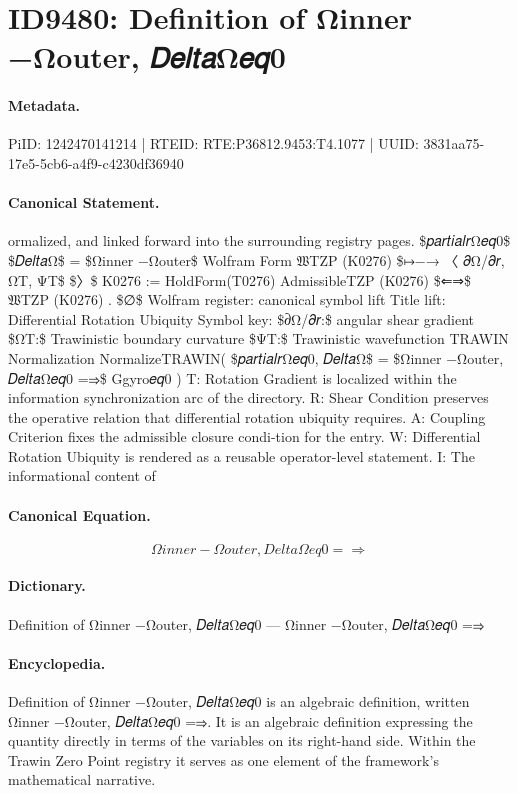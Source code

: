 \section*{ID9480: Definition of Ωinner −Ωouter, 𝐷𝑒𝑙𝑡𝑎Ω𝑒𝑞0}
\paragraph{Metadata.}
PiID: 1242470141214 | RTEID: RTE:P36812.9453:T4.1077 | UUID: 3831aa75-17e5-5cb6-a4f9-c4230df36940

\paragraph{Canonical Statement.}
ormalized, and linked forward into the surrounding registry pages. \$𝑝𝑎𝑟𝑡𝑖𝑎𝑙𝑟Ω𝑒𝑞0\$ \$𝐷𝑒𝑙𝑡𝑎Ω\$ = \$Ωinner −Ωouter\$ Wolfram Form 𝔚TZP (K0276) \$↦−→ 〈 𝜕Ω/𝜕𝑟, ΩT, ΨT\$ \$〉\$ K0276 := HoldForm(T0276) AdmissibleTZP (K0276) \$⇐⇒\$ 𝔚TZP (K0276) . \$∅\$ Wolfram register: canonical symbol lift Title lift: Differential Rotation Ubiquity Symbol key: \$𝜕Ω/𝜕𝑟:\$ angular shear gradient \$ΩT:\$ Trawinistic boundary curvature \$ΨT:\$ Trawinistic wavefunction TRAWIN Normalization NormalizeTRAWIN( \$𝑝𝑎𝑟𝑡𝑖𝑎𝑙𝑟Ω𝑒𝑞0, 𝐷𝑒𝑙𝑡𝑎Ω\$ = \$Ωinner −Ωouter, 𝐷𝑒𝑙𝑡𝑎Ω𝑒𝑞0 =⇒\$ Ggyro𝑒𝑞0 ) T: Rotation Gradient is localized within the information synchronization arc of the directory. R: Shear Condition preserves the operative relation that differential rotation ubiquity requires. A: Coupling Criterion fixes the admissible closure condi-tion for the entry. W: Differential Rotation Ubiquity is rendered as a reusable operator-level statement. I: The informational content of

\paragraph{Canonical Equation.}
\[
Ωinner −Ωouter, 𝐷𝑒𝑙𝑡𝑎Ω𝑒𝑞0 =⇒
\]

\paragraph{Dictionary.}
Definition of Ωinner −Ωouter, 𝐷𝑒𝑙𝑡𝑎Ω𝑒𝑞0 — Ωinner −Ωouter, 𝐷𝑒𝑙𝑡𝑎Ω𝑒𝑞0 =⇒

\paragraph{Encyclopedia.}
Definition of Ωinner −Ωouter, 𝐷𝑒𝑙𝑡𝑎Ω𝑒𝑞0 is an algebraic definition, written Ωinner −Ωouter, 𝐷𝑒𝑙𝑡𝑎Ω𝑒𝑞0 =⇒. It is an algebraic definition expressing the quantity directly in terms of the variables on its right-hand side. Within the Trawin Zero Point registry it serves as one element of the framework's mathematical narrative.
